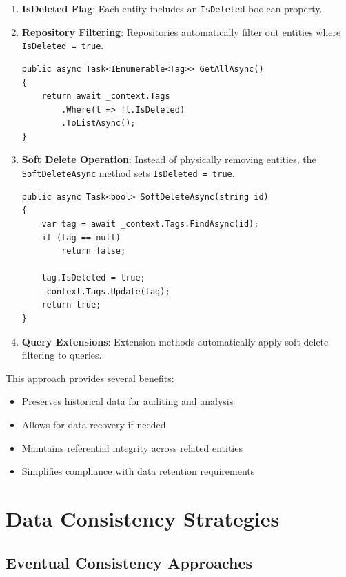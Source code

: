 \begin{enumerate}
   \item \textbf{IsDeleted Flag}: Each entity includes an \texttt{IsDeleted} boolean property.

   \item \textbf{Repository Filtering}: Repositories automatically filter out entities where \texttt{IsDeleted = true}.

\begin{verbatim}
public async Task<IEnumerable<Tag>> GetAllAsync()
{
    return await _context.Tags
        .Where(t => !t.IsDeleted)
        .ToListAsync();
}
\end{verbatim}

   \item \textbf{Soft Delete Operation}: Instead of physically removing entities, the \texttt{SoftDeleteAsync} method sets \texttt{IsDeleted = true}.

\begin{verbatim}
public async Task<bool> SoftDeleteAsync(string id)
{
    var tag = await _context.Tags.FindAsync(id);
    if (tag == null)
        return false;

    tag.IsDeleted = true;
    _context.Tags.Update(tag);
    return true;
}
\end{verbatim}

   \item \textbf{Query Extensions}: Extension methods automatically apply soft delete filtering to queries.
\end{enumerate}

This approach provides several benefits:
\begin{itemize}
   \item Preserves historical data for auditing and analysis
   \item Allows for data recovery if needed
   \item Maintains referential integrity across related entities
   \item Simplifies compliance with data retention requirements
\end{itemize}

\section{Data Consistency Strategies}

\subsection{Eventual Consistency Approaches}

